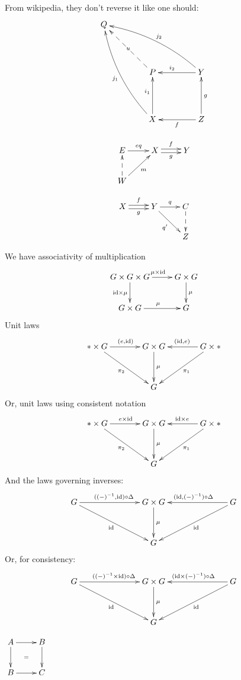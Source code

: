 \documentclass{article}
\begin{document}
\M
From wikipedia, they don't reverse it like one should:
\begin{equation*}
  \xymatrix@C+2em@R+2em{
   Q \ar@/_10pt/@{<-}[ddr]_{j_1} \ar@/^10pt/@{<-}[drr]^{j_2}
     \ar@{<--}[dr]|*+<3pt,3pt>{\scriptstyle u} & & \\
   & P \ar@{<-}[d]_(0.4){i_1} \ar@{<-}[r]^(0.4){i_2} & Y \ar@{<-}[d]^{g}\\
   & X \ar@{<-}[r]_{f} & Z
  }
\end{equation*}

\begin{equation*}
  \xymatrix{
    E\ar[r]^{eq} & X \ar@<0.5ex>[r]^{f}_{}\ar@<-0.5ex>[r]_{g} & Y\\
    W\ar@{-->}[u]\ar[ur]_{m} & &
  }
\end{equation*}

\begin{equation*}
  \xymatrix{
    X \ar@<0.5ex>[r]^{f}_{}\ar@<-0.5ex>[r]_{g} & Y \ar[r]^{q}\ar[dr]_{q'} & C\ar@{-->}[d]\\
    & & Z
  }
\end{equation*}

We have associativity of multiplication
\def\id{\mathrm{id}}
\begin{equation*}
  \xymatrix{
    G\times G\times G \ar[d]_{\id\times\mu}\ar[r]^{\mu\times\id} & G\times G\ar[d]^{\mu}\\
    G\times G\ar[r]^{\mu} & G
    }
\end{equation*}
Unit laws
\begin{equation*}
  \xymatrix @C=3pc @R=3pc{
    \ast\times G\ar[dr]_{\pi_{2}}
    \ar[r]^{(e,\id)} & G\times G\ar[d]^{\mu} &
    \ar[l]_{(\id,e)}\ar[dl]^{\pi_{1}}
    G\times\ast\\
    & G &
  }
\end{equation*}
Or, unit laws using consistent notation
\begin{equation*}
  \xymatrix @C=3pc @R=3pc{
    \ast\times G\ar[dr]_{\pi_{2}}
    \ar[r]^{e\times\id} & G\times G\ar[d]^{\mu} &
    \ar[l]_{\id\times e}\ar[dl]^{\pi_{1}}
    G\times\ast\\
    & G &
  }
\end{equation*}
And the laws governing inverses:
\begin{equation*}
  \xymatrix @C=6pc @R=3pc{
    G\ar[dr]_{\id}\ar[r]^{((-)^{-1},\id)\circ\Delta} & G\times G\ar[d]^{\mu} & \ar[l]_{(\id,(-)^{-1})\circ\Delta}\ar[dl]^{\id} G\\
    & G &
  }
\end{equation*}
Or, for consistency:
\begin{equation*}
  \xymatrix @C=6pc @R=3pc{
    G\ar[dr]_{\id}\ar[r]^{((-)^{-1}\times\id)\circ\Delta} & G\times G\ar[d]^{\mu} & \ar[l]_{(\id\times(-)^{-1})\circ\Delta}\ar[dl]^{\id} G\\
    & G &
  }
\end{equation*}

\M
{}

\M
$\xymatrix{\ar @{} [dr] |{=}
  A \ar[d] \ar[r] & B \ar[d] \\
B \ar[r] & C }$
\end{document}
